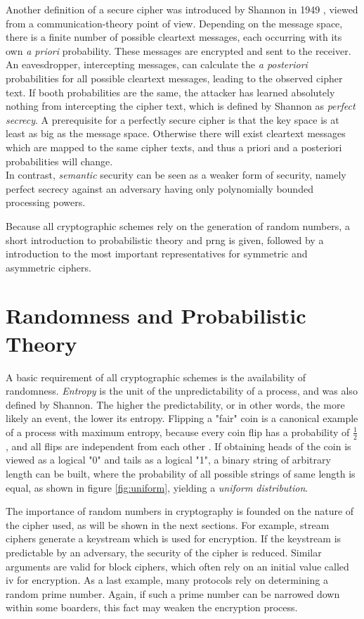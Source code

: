 Another definition of a secure cipher was introduced by Shannon in 1949 \cite{6769090}, viewed from a communication-theory point of view. Depending on the
message space, there is a finite number of possible cleartext messages, each occurring with its own \textit{a priori} probability. These messages are encrypted
and sent to the receiver. An eavesdropper, intercepting messages, can calculate the \textit{a posteriori} probabilities for all possible cleartext messages, 
leading to the observed cipher text. If booth probabilities are the same, the attacker has learned absolutely nothing from intercepting the cipher text, which
is defined by Shannon as \textit{perfect secrecy}. A prerequisite for a perfectly secure cipher is that the key space is at least as big as the message space.
Otherwise there will exist cleartext messages which are mapped to the same cipher texts, and thus a priori and a posteriori probabilities will change.
\\

In contrast, \textit{semantic} security can be seen as a weaker form of security, namely perfect secrecy against an adversary having only polynomially bounded
processing powers.

Because all cryptographic schemes rely on the generation of random numbers, a short introduction to probabilistic theory and \gls{prng} is given,
followed by a introduction to the most important representatives for symmetric and asymmetric ciphers.

\section{Randomness and Probabilistic Theory}

A basic requirement of all cryptographic schemes is the availability of randomness. \textit{Entropy} is the unit of the unpredictability of a process, and was
also defined by Shannon. The higher the predictability, or in other words, the more likely an event, the lower its entropy. Flipping a "fair" coin is a canonical 
example of a process with maximum entropy, because every coin flip has a probability of $\frac{1}{2}$, and all flips are independent from each other \cite{1621063}.
If obtaining heads of the coin is viewed as a logical "0" and tails as a logical "1", a binary string of arbitrary length can be built, where the probability of all possible
strings of same length is equal, as shown in figure \ref{fig:uniform}, yielding a \textit{uniform distribution}. 

The importance of random numbers in cryptography is founded on the nature of the cipher used, as will be shown in the next sections. For example,
stream ciphers generate a keystream which is used
for encryption. If the keystream is predictable by an adversary, the security of the cipher is reduced. Similar arguments are valid for block ciphers, which often
rely on an initial value called \gls{iv} for encryption. As a last example, many protocols rely on determining a random prime number. Again, if such a prime number
can be narrowed down within some boarders, this fact may weaken the encryption process.


